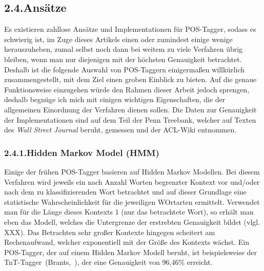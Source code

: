 \documentclass{article}
\begin{document}
\subsection{2.4.\hspace*{0.5em}Ansätze}\label{sec-anstze}%

\noindent{}Es existieren zahllose Ansätze und Implementationen für POS-Tagger, sodass es schwierig ist, im Zuge dieses Artikels einen oder zumindest einige wenige herauszuheben, zumal selbst noch dann bei weitem zu viele Verfahren übrig bleiben, wenn man nur diejenigen mit der höchsten Genauigkeit betrachtet. Deshalb ist die folgende Auswahl von POS-Taggern einigermaßen willkürlich zusammengestellt, mit dem Ziel einen groben Einblick zu bieten.
Auf die genaue Funktionsweise einzugehen würde den Rahmen dieser Arbeit jedoch sprengen, deshalb begnüge ich mich mit einigen wichtigen Eigenschaften, die der allgemeinen Einordnung der Verfahren dienen sollen.
Die Daten zur Genauigkeit der Implementationen sind auf dem Teil der Penn Treebank, welcher auf Texten des \emph{Wall Street Journal} beruht, gemessen und der ACL-Wiki entnommen.%

\subsubsection{2.4.1.\hspace*{0.5em}Hidden Markov Model (HMM)}\label{sec-hidden-markov-model-hmm}%

\noindent{}Einige der frühen POS-Tagger basieren auf Hidden Markov Modellen. Bei diesem Verfahren wird jeweils ein nach Anzahl Worten begrenzter Kontext vor und/oder nach dem zu klassifizierenden Wort betrachtet und auf dieser Grundlage eine statistische Wahrscheinlichkeit für die jeweiligen WOrtarten ermittelt. Verwendet man für die Länge dieses Kontexts 1 (nur das betrachtete Wort), so erhält man eben das Modell, welches die Untergrenze der erstrebten Genauigkeit bildet (vlgl. XXX). Das Betrachten sehr großer Kontexte hingegen scheitert am Rechenaufwand, welcher exponentiell mit der Größe des Kontexts wächst.
Ein POS-Tagger, der auf einem Hidden Markov Modell beruht, ist beispielsweise der TnT-Tagger~(Brants,~), der eine Genauigkeit von 96,46\% erreicht.%
\end{document}
